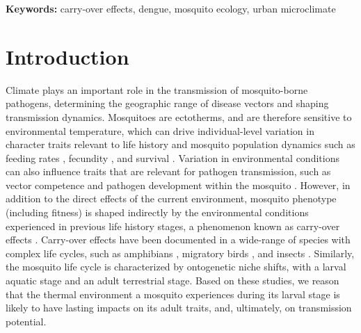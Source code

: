 \documentclass[12pt]{article}
\begin{document}
\smallskip

\textbf{Keywords:} carry-over effects, dengue, mosquito ecology, urban microclimate

\linenumbers
\doublespacing
\setlength\parindent{20pt}%

\newpage

\section{Introduction}

Climate plays an important role in the transmission of mosquito-borne pathogens, determining the geographic range of disease vectors and shaping transmission dynamics. Mosquitoes are ectotherms, and are therefore sensitive to environmental temperature, which can drive individual-level variation in character traits relevant to life history and mosquito population dynamics such as feeding rates \citep{delatte2009}, fecundity \citep{yang2009}, and survival \citep{alto2001}. Variation in environmental conditions can also influence traits that are relevant for pathogen transmission, such as vector competence and pathogen development within the mosquito \citep{lambrechts2011}. However, in addition to the direct effects of the current environment, mosquito phenotype (including fitness) is shaped indirectly by the environmental conditions experienced in previous life history stages, a phenomenon known as carry-over effects \citep{harrison2011}. Carry-over effects have been documented in a wide-range of species with complex life cycles, such as amphibians \citep{vonesh2005}, migratory birds \citep{norris2006}, and insects \citep{deblock2005a, roux2015a}. Similarly, the mosquito life cycle is characterized by ontogenetic niche shifts, with a larval aquatic stage and an adult terrestrial stage. Based on these studies, we reason that the thermal environment a mosquito experiences during its larval stage is likely to have lasting impacts on its adult traits, and, ultimately, on transmission potential.
\end{document}
